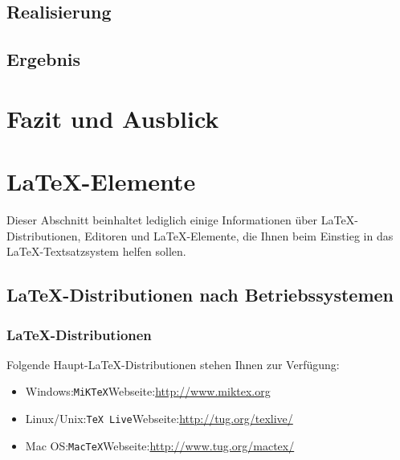 \documentclass[12pt,a4paper,bibliography=totocnumbered,listof=totocnumbered]{scrartcl}
\begin{document}
\subsection{Realisierung}
\subsection{Ergebnis}


\pagebreak

\section{Fazit und Ausblick}



\pagebreak
\section{\LaTeX-Elemente}
Dieser Abschnitt beinhaltet lediglich einige Informationen über \LaTeX-Distributionen, Editoren und \LaTeX-Elemente, die Ihnen beim Einstieg in das \LaTeX-Textsatzsystem helfen sollen.

\subsection{\LaTeX-Distributionen nach Betriebssystemen}

\subsubsection{\LaTeX-Distributionen}
Folgende Haupt-\LaTeX-Distributionen stehen Ihnen zur Verfügung:
\begin{itemize}
  \item Windows:\quad \texttt{MiKTeX}\quad Webseite:\quad\url{http://www.miktex.org}
  \item Linux/Unix:\quad \texttt{TeX Live}\quad Webseite:\quad\url{http://tug.org/texlive/}
  \item Mac OS:\quad \texttt{MacTeX}\quad Webseite:\quad\url{http://www.tug.org/mactex/}
\end{itemize}
\end{document}
